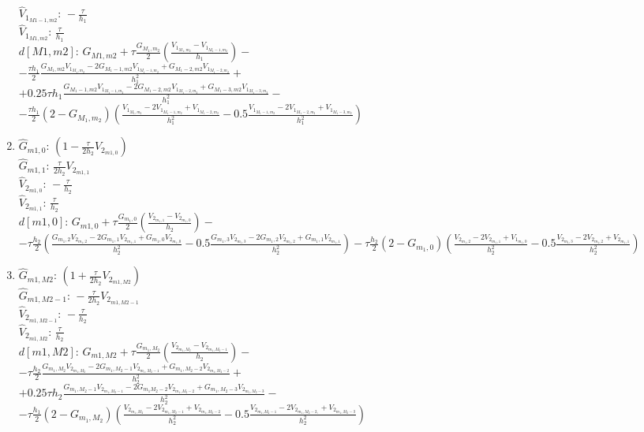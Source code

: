 \documentclass[a4paper]{article}
\theoremstyle{definition}
\numberwithin{equation}{section}
\begin{document}
\begin{enumerate}
$\hat{V}_{1_{M1-1,m2}} : \, -\frac{\tau}{h_1}$\\
$\hat{V}_{1_{M1,m2}} : \, \frac{\tau}{h_1}$\\
$d[M1,m2] : \, G_{M1,m2} + \tau\frac{G_{M_1,m_2}}{2}\left( \frac{V_{1_{M_1,m_2}} - V_{1_{M_1-1,m_2}}}{h_1}\right) -$\\$- \frac{\tau h_1}{2} \frac{G_{M_1,m2}V_{1_{M_1,m_2}} - 2G_{M_1-1,m2}V_{1_{M_1-1,m_2}} + G_{M_1-2,m2}V_{1_{M_1-2,m_2}}}{h_1^2} +$\\$+ 0.25\tau h_1\frac{G_{M_1-1,m2}V_{1_{M_1-1,m_2}} - 2G_{M_1-2,m2}V_{1_{M_1-2,m_2}} + G_{M_1-3,m2}V_{1_{M_1-3,m_2}}}{h_1^2} -$\\$- \frac{\tau h_1}{2}(2-G_{M_1,m_2})\left( \frac{V_{1_{M_1,m_2}} - 2V_{1_{M_1-1,m_2}} + V_{1_{M_1-2,m_2}}}{h_1^2} - 0.5\frac{V_{1_{M_1-1,m_2}} - 2V_{1_{M_1-2,m_2}} + V_{1_{M_1-3,m_2}}}{h_1^2} \right)$
\item 
$\hat{G}_{m1,0} : \, (1 -\frac{\tau}{2h_2} V_{2_{m1,0}})$ \\
$\hat{G}_{m1,1} : \, \frac{\tau}{2h_2}V_{2_{m1,1}}$ \\
$\hat{V}_{2_{m1,0}} : \, -\frac{\tau}{h_2}$\\
$\hat{V}_{2_{m1,1}} : \, \frac{\tau}{h_2}$\\
$d[m1,0] : \, G_{m1,0}+\tau\frac{G_{m_1,0}}{2}\left(\frac{V_{2_{m_1,1}} - V_{2_{m_1,0}}}{h_2} \right) -$\\$- \tau\frac{h_2}{2}\left( \frac{G_{m_1,2}V_{2_{m_1,2}} - 2G_{m_1,1}V_{2_{m_1,1}} + G_{m_1,0}V_{2_{m_1,0}}}{h_2^2} - 0.5\frac{G_{m_1,3}V_{2_{m_1,3}} - 2G_{m_1,2}V_{2_{m_1,2}} + G_{m_1,1}V_{2_{m_1,1}}}{h_2^2} \right) - \tau\frac{h_2}{2}(2-G_{m_1,0})\left( \frac{V_{2_{m_1,2}} - 2V_{2_{m_1,1}} + V_{1_{m_1,0}}}{h_2^2} - 0.5\frac{V_{2_{m_1,3}} - 2V_{2_{m_1,2}} + V_{2_{m_1,1}}}{h_2^2} \right) $
\item 
$\hat{G}_{m1,M2} : \, (1 +\frac{\tau}{2h_2} V_{2_{m1,M2}})$ \\
$\hat{G}_{m1,M2-1} : \, -\frac{\tau}{2h_2}V_{2_{m1,M2-1}}$ \\
$\hat{V}_{2_{m1,M2-1}} : \, -\frac{\tau}{h_2}$\\
$\hat{V}_{2_{m1,M2}} : \, \frac{\tau}{h_2}$\\
$d[m1,M2] : \, G_{m1,M2} + \tau\frac{G_{m_1,M_2}}{2}\left( \frac{V_{2_{m_1,M_2}} - V_{2_{m_1,M_2-1}}}{h_2} \right) -$\\$- \tau\frac{h_2}{2} \frac{G_{m_1,M_2}V_{2_{m_1,M_2}} - 2G_{m_1,M_2-1}V_{2_{m_1,M_2-1}} + G_{m_1,M_2-2}V_{2_{m_1,M_2-2}}}{h_2^2} +$\\$+ 0.25\tau h_2\frac{G_{m_1,M_2-1}V_{2_{m_1,M_2-1}} - 2G_{m_1M_2-2}V_{2_{m_1,M_2-2}} + G_{m_1,M_2-3}V_{2_{m_1,M_2-3}}}{h_2^2} -$\\$- \tau\frac{h_1}{2}(2-G_{m_1,M_2})\left( \frac{V_{2_{m_1,M_2}} - 2V_{2_{m_1,M_2-1}} + V_{2_{m_1,M_2-2}}}{h_2^2} - 0.5\frac{V_{2_{m_1,M_2-1}} - 2V_{2_{m_1,M_2-2,}} + V_{2_{m_1,M_2-3}}}{h_2^2} \right)$

\end{enumerate}
\end{document}
